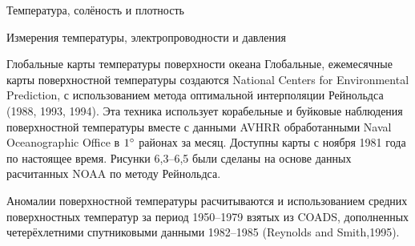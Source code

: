 \begin{chapter}{Температура, солёность и плотность}
\begin{section}{Измерения температуры, электропроводности и давления}
\begin{paragraph}{Глобальные карты температуры поверхности океана}
Глобальные, ежемесячные карты поверхностной температуры создаются
National Centers for Environmental Prediction, с использованием метода
оптимальной интерполяции Рейнольдса (1988, 1993, 1994). Эта техника
использует корабельные и буйковые наблюдения поверхностной температуры
вместе с данными AVHRR обработанными Naval Oceanographic Office в
${1}^\circ$ районах за месяц. Доступны карты с ноября 1981 года по
настоящее время. Рисунки 6,3--6,5 были сделаны на основе данных
расчитанных NOAA по методу Рейнольдса.
%


Аномалии поверхностной температуры расчитываются и использованием
средних поверхностных температур за период 1950--1979 взятых из
COADS, дополненных четерёхлетними спутниковыми данными 1982--1985
(Reynolds and Smith,1995).
%
\end{paragraph}
\end{section}


\end{chapter}
